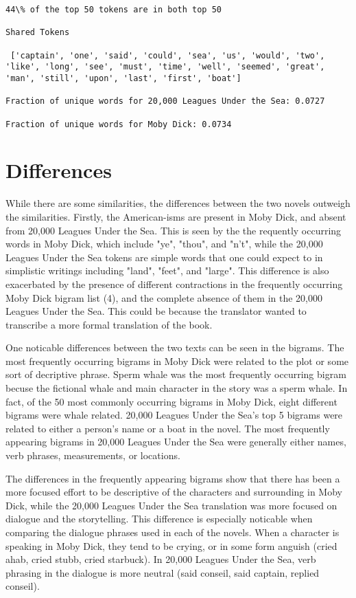 \documentclass[11pt]{article}
\begin{document}
    \begin{Verbatim}[commandchars=\\\{\}]
44\% of the top 50 tokens are in both top 50

Shared Tokens

 ['captain', 'one', 'said', 'could', 'sea', 'us', 'would', 'two', 'like', 'long', 'see', 'must', 'time', 'well', 'seemed', 'great', 'man', 'still', 'upon', 'last', 'first', 'boat']

Fraction of unique words for 20,000 Leagues Under the Sea: 0.0727

Fraction of unique words for Moby Dick: 0.0734

    \end{Verbatim}

    \section{Differences}\label{differences}

While there are some similarities, the differences between the two
novels outweigh the similarities. Firstly, the American-isms are present
in Moby Dick, and absent from 20,000 Leagues Under the Sea. This is seen
by the the requently occurring words in Moby Dick, which include "ye",
"thou", and "n't", while the 20,000 Leagues Under the Sea tokens are
simple words that one could expect to in simplistic writings including
"land", "feet", and "large". This difference is also exacerbated by the
presence of different contractions in the frequently occurring Moby Dick
bigram list (4), and the complete absence of them in the 20,000 Leagues
Under the Sea. This could be because the translator wanted to transcribe
a more formal translation of the book.

One noticable differences between the two texts can be seen in the
bigrams. The most frequently occurring bigrams in Moby Dick were related
to the plot or some sort of decriptive phrase. Sperm whale was the most
frequently occurring bigram becuse the fictional whale and main
character in the story was a sperm whale. In fact, of the 50 most
commonly occurring bigrams in Moby Dick, eight different bigrams were
whale related. 20,000 Leagues Under the Sea's top 5 bigrams were related
to either a person's name or a boat in the novel. The most frequently
appearing bigrams in 20,000 Leagues Under the Sea were generally either
names, verb phrases, measurements, or locations.

The differences in the frequently appearing bigrams show that there has
been a more focused effort to be descriptive of the characters and
surrounding in Moby Dick, while the 20,000 Leagues Under the Sea
translation was more focused on dialogue and the storytelling. This
difference is especially noticable when comparing the dialogue phrases
used in each of the novels. When a character is speaking in Moby Dick,
they tend to be crying, or in some form anguish (cried ahab, cried
stubb, cried starbuck). In 20,000 Leagues Under the Sea, verb phrasing
in the dialogue is more neutral (said conseil, said captain, replied
conseil).
\end{document}
